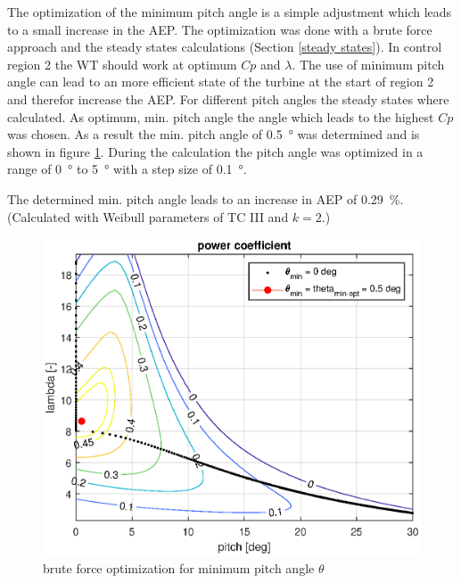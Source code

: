 The optimization of the minimum pitch angle is a simple adjustment which leads to a small increase in the AEP. 
The optimization was done with a brute force approach and the steady states calculations (Section \ref{steady states}). 
In control region 2 the WT should work at optimum $Cp$ and $\lambda$. 
The use of minimum pitch angle can lead to an more efficient state of the turbine at the start of region 2 and therefor increase the AEP. 
For different pitch angles the steady states where calculated. 
As optimum, min. pitch angle the angle which leads to the highest $Cp$ was chosen. 
As a result the min. pitch angle of \SI{0.5}{\degree} was determined and is shown in figure \ref{fig:theta min general}. 
During the calculation the pitch angle was optimized in a range of \SI{0}{\degree} to \SI{5}{\degree} with a step size of \SI{0.1}{\degree}.

The determined min. pitch angle leads to an increase in AEP of \SI{0.29}{\%}. 
(Calculated with Weibull parameters of TC III and $k=2$.)

\begin{figure}[h]
	\centering	
	\includegraphics[width=12cm]{Figures/ThetaMinOpt.eps}
	\caption{brute force optimization for minimum pitch angle $\theta$}
	\label{fig:theta min general}
\end{figure}